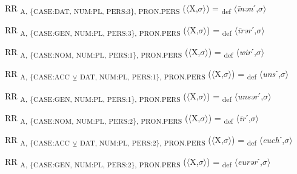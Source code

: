 {\begin{exe}
 RR \textsubscript{A, \{CASE:DAT, NUM:PL, PERS:3\}, PRON.PERS} ($\langle$X,$\sigma $$\rangle$) = \textsubscript{def} $\langle$\textit{\=inən}ˊ,$\sigma $$\rangle$
\end{exe}

\begin{exe}
 RR \textsubscript{A, \{CASE:GEN, NUM:PL, PERS:3\}, PRON.PERS} ($\langle$X,$\sigma $$\rangle$) = \textsubscript{def} $\langle$\textit{\=irər}ˊ,$\sigma $$\rangle$
\end{exe}

\begin{exe}
 RR \textsubscript{A, \{CASE:NOM, NUM:PL, PERS:1\}, PRON.PERS} ($\langle$X,$\sigma $$\rangle$) = \textsubscript{def} $\langle$\textit{wir}ˊ,$\sigma $$\rangle$
\end{exe}

\begin{exe}
 RR \textsubscript{A, \{CASE:ACC} \textsubscript{${\veebar}$}\textsubscript{ DAT, NUM:PL, PERS:1\}, PRON.PERS} ($\langle$X,$\sigma $$\rangle$) = \textsubscript{def} $\langle$\textit{uns}ˊ,$\sigma $$\rangle$
\end{exe}

\begin{exe}
 RR \textsubscript{A, \{CASE:GEN, NUM:PL, PERS:1\}, PRON.PERS} ($\langle$X,$\sigma $$\rangle$) = \textsubscript{def} $\langle$\textit{unsər}ˊ,$\sigma $$\rangle$
\end{exe}

\begin{exe}
 RR \textsubscript{A, \{CASE:NOM, NUM:PL, PERS:2\}, PRON.PERS} ($\langle$X,$\sigma $$\rangle$) = \textsubscript{def} $\langle$\textit{\=ir}ˊ,$\sigma $$\rangle$
\end{exe}

\begin{exe}
 RR \textsubscript{A, \{CASE:ACC} \textsubscript{${\veebar}$}\textsubscript{ DAT, NUM:PL, PERS:2\}, PRON.PERS} ($\langle$X,$\sigma $$\rangle$) = \textsubscript{def} $\langle$\textit{euch}ˊ,$\sigma $$\rangle$
\end{exe}

\begin{exe}
 RR \textsubscript{A, \{CASE:GEN, NUM:PL, PERS:2\}, PRON.PERS} ($\langle$X,$\sigma $$\rangle$) = \textsubscript{def} $\langle$\textit{eurər}ˊ,$\sigma $$\rangle$
\end{exe}

}
